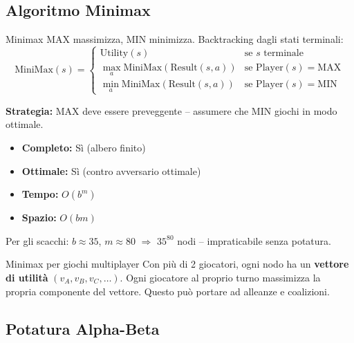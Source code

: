 \documentclass[12pt,a4paper]{article}
\begin{document}
\subsection{Algoritmo Minimax}

\begin{thmbox}{Minimax}
MAX massimizza, MIN minimizza. Backtracking dagli stati terminali:
\[
\text{MiniMax}(s) =
\begin{cases}
\text{Utility}(s) & \text{se } s \text{ terminale} \\
\max_{a} \text{MiniMax}(\text{Result}(s,a)) & \text{se Player}(s) = \text{MAX} \\
\min_{a} \text{MiniMax}(\text{Result}(s,a)) & \text{se Player}(s) = \text{MIN}
\end{cases}
\]

\textbf{Strategia:} MAX deve essere preveggente -- assumere che MIN giochi in modo ottimale.

\begin{itemize}[noitemsep]
  \item \textbf{Completo:} Sì (albero finito)
  \item \textbf{Ottimale:} Sì (contro avversario ottimale)
  \item \textbf{Tempo:} $O(b^m)$
  \item \textbf{Spazio:} $O(bm)$
\end{itemize}
Per gli scacchi: $b \approx 35$, $m \approx 80$ $\Rightarrow$ $35^{80}$ nodi -- impraticabile senza potatura.
\end{thmbox}

\begin{warnbox}{Minimax per giochi multiplayer}
Con più di 2 giocatori, ogni nodo ha un \textbf{vettore di utilità} $(v_A, v_B, v_C, \ldots)$. Ogni giocatore al proprio turno massimizza la propria componente del vettore. Questo può portare ad alleanze e coalizioni.
\end{warnbox}

\subsection{Potatura Alpha-Beta}
\end{document}
